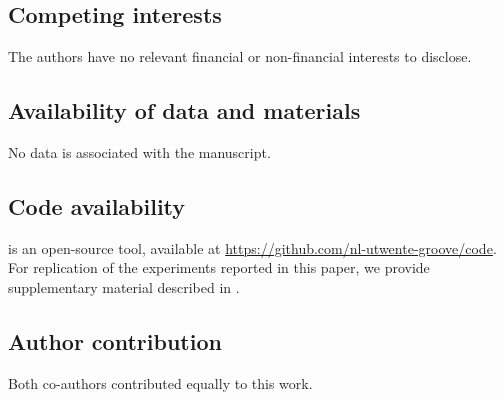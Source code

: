 \documentclass[sn-mathphys-num,a4paper,iicol,lineno,pdflatex]{sn-jnl-hacked}
\theoremstyle{thmwithspace}%
\theoremstyle{thmwithspace}%
\begin{document}
\subsection*{Competing interests}
The authors have no relevant financial or non-financial interests to disclose.

\subsection*{Availability of data and materials}
No data is associated with the manuscript.

\subsection*{Code availability}

\GROOVE is an open-source tool, available at \url{https://github.com/nl-utwente-groove/code}. For replication of the \GROOVE experiments reported in this paper, we provide supplementary material described in .


\subsection*{Author contribution}

Both co-authors contributed equally to this work.

\begin{appendices}



\end{appendices}

\clearpage


\end{document}
